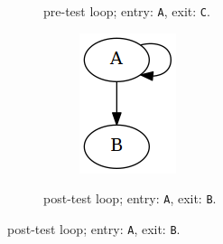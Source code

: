 \begin{figure}[htbp]
\begin{subfigure}[ht]{0.32\textwidth}
\begin{subfigure}[ht]{0.50\textwidth}
		\end{subfigure}
		\caption{pre-test loop; entry: \texttt{A}, exit: \texttt{C}.}
		\label{fig:pre_loop_graph_representation}
	\end{subfigure}
	\qquad
	\begin{subfigure}[ht]{0.30\textwidth}
		\centering
		\begin{subfigure}[ht]{0.50\textwidth}
			
		\end{subfigure}
		\begin{subfigure}[ht]{0.35\textwidth}
			\includegraphics[width=\textwidth]{inc/primitives/post_loop.png}
		\end{subfigure}
		\caption{post-test loop; entry: \texttt{A}, exit: \texttt{B}.}
		\label{fig:post_loop_graph_representation}

\end{subfigure}
\end{figure}

